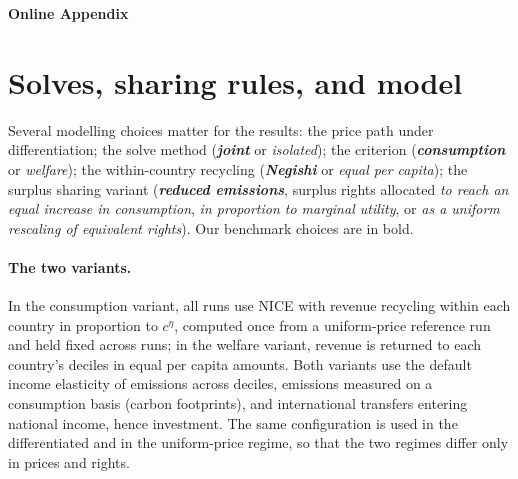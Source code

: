 \documentclass[12pt,english]{article}
\newif\ifblind
\theoremstyle{remark}
\begin{document}
\singlespacing
\ifblind
  
\else
  
\fi
%

\clearpage
\appendix
\nolinenumbers
\setcounter{table}{0}
\renewcommand{\thetable}{A\arabic{table}}
\setcounter{figure}{0}
\renewcommand{\thefigure}{A\arabic{figure}}
\begin{center}\Large\bfseries Online Appendix\end{center}

\section{Solves, sharing rules, and model}
\label{app:variants}

Several modelling choices matter for the results: the price path under differentiation; the solve method (\textbf{\textit{joint}} or \textit{isolated}); the criterion (\textbf{\textit{consumption}} or \textit{welfare}); the within-country recycling (\textbf{\textit{Negishi}} or \textit{equal per capita}); the surplus sharing variant (\textbf{\textit{reduced emissions}}, surplus rights allocated \textit{to reach an equal increase in consumption}, \textit{in proportion to marginal utility}, or \textit{as a uniform rescaling of equivalent rights}). Our benchmark choices are in bold.

\paragraph{The two variants.} In the consumption variant, all runs use NICE with revenue recycling within each country in proportion to $c^{\eta}$, computed once from a uniform-price reference run and held fixed across runs; in the welfare variant, revenue is returned to each country's deciles in equal per capita amounts.
Both variants use the default income elasticity of emissions across deciles, emissions measured on a consumption basis (carbon footprints), and international transfers entering national income, hence investment. The same configuration is used in the differentiated and in the uniform-price regime, so that the two regimes differ only in prices and rights.
\end{document}
